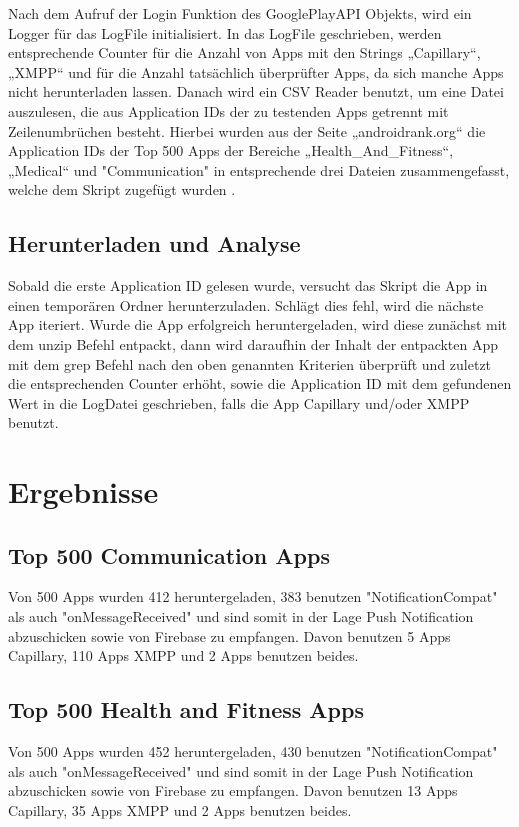 \documentclass[sigconf]{acmart}
\begin{document}
Nach dem Aufruf der Login Funktion des GooglePlayAPI Objekts, 
wird ein Logger für das LogFile initialisiert. In das LogFile geschrieben, werden 
entsprechende Counter für die Anzahl von Apps mit den 
Strings „Capillary“, „XMPP“ und für die Anzahl tatsächlich überprüfter Apps, da sich 
manche Apps nicht herunterladen lassen.
Danach wird ein CSV Reader benutzt, um eine Datei auszulesen, die aus 
Application IDs der zu testenden Apps getrennt mit Zeilenumbrüchen besteht. 
Hierbei wurden aus der Seite „androidrank.org“ die Application IDs der Top 500 
Apps der Bereiche „Health\_And\_Fitness“, „Medical“ und "Communication" in entsprechende 
drei Dateien zusammengefasst, welche dem Skript zugefügt wurden \cite{androidrank}\cite{androidrank1}\cite{androidrank2}.

\subsection{Herunterladen und Analyse}
Sobald die erste Application ID gelesen wurde, versucht das Skript die App 
in einen temporären Ordner herunterzuladen. Schlägt dies fehl, wird die 
nächste App iteriert. Wurde die App erfolgreich heruntergeladen, wird diese 
zunächst mit dem unzip Befehl entpackt, dann wird daraufhin der Inhalt der 
entpackten App mit dem grep Befehl nach den oben genannten Kriterien 
überprüft und zuletzt die entsprechenden Counter erhöht, sowie die 
Application ID mit dem gefundenen Wert in die LogDatei geschrieben, falls 
die App Capillary und/oder XMPP benutzt.

\section{Ergebnisse}

\subsection{Top 500 Communication Apps}
Von 500 Apps wurden 412 heruntergeladen, 383 benutzen "NotificationCompat" als auch "onMessageReceived" 
und sind somit in der Lage Push Notification abzuschicken sowie von Firebase zu empfangen. Davon benutzen 5 Apps Capillary, 110 Apps XMPP 
und 2 Apps benutzen beides.

\subsection{Top 500 Health and Fitness Apps}
Von 500 Apps wurden 452 heruntergeladen, 430 benutzen "NotificationCompat" als auch "onMessageReceived" 
und sind somit in der Lage Push Notification abzuschicken sowie von Firebase zu empfangen. Davon benutzen 13 Apps Capillary, 
35 Apps XMPP und 2 Apps benutzen beides.
\end{document}
